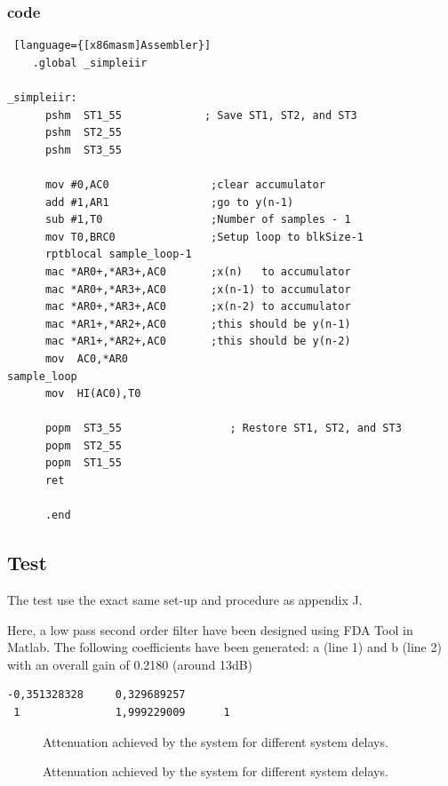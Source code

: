 \subsubsection{code}
\begin{lstlisting} [language={[x86masm]Assembler}]
	.global _simpleiir
       
_simpleiir:
      pshm  ST1_55             ; Save ST1, ST2, and ST3
      pshm  ST2_55
      pshm  ST3_55
      
      mov #0,AC0				;clear accumulator
      add #1,AR1				;go to y(n-1) 
      sub #1,T0                 ;Number of samples - 1
      mov T0,BRC0            	;Setup loop to blkSize-1
      rptblocal sample_loop-1
      mac *AR0+,*AR3+,AC0 		;x(n) 	to accumulator
      mac *AR0+,*AR3+,AC0 		;x(n-1) to accumulator
      mac *AR0+,*AR3+,AC0 		;x(n-2) to accumulator
      mac *AR1+,*AR2+,AC0 		;this should be y(n-1)    
      mac *AR1+,*AR2+,AC0 		;this should be y(n-2)   
      mov  AC0,*AR0 
sample_loop
      mov  HI(AC0),T0
                   
      popm  ST3_55                 ; Restore ST1, ST2, and ST3
      popm  ST2_55
      popm  ST1_55
      ret
	
      .end
\end{lstlisting}

\subsection{Test}

The test use the exact same set-up and procedure as appendix J. 

Here, a low pass second order filter have been designed using FDA Tool in Matlab. The following coefficients have been generated: a (line 1) and b (line 2) with an overall gain of 0.2180 (around 13dB)
\begin{lstlisting}
-0,351328328	 0,329689257	
 1				 1,999229009	  1
\end{lstlisting}


\begin{figure}[H]
	\centering
	
	\caption{Attenuation achieved by the system for different system delays.}
	\label{Fig:FrequencyResponseDesignIIR}
\end{figure}

\begin{figure}[H]
	\centering
	
	\caption{Attenuation achieved by the system for different system delays.}
	\label{Fig:FrequencyResponseIIR}
\end{figure}
